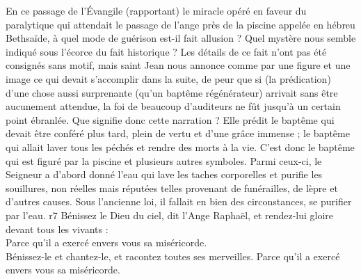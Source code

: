 \documentclass[twoside]{article}
\begin{document}
\begin{paracol}[1]{2}
{		En ce passage de l’Évangile (rapportant) le miracle opéré en faveur du paralytique qui attendait le passage de l’ange près de la piscine appelée en hébreu Bethsaïde, à quel mode de guérison est-il fait allusion ? Quel mystère nous semble indiqué sous l’écorce du fait historique ? Les détails de ce fait n’ont pas été consignés sans motif, mais saint Jean nous annonce comme par une figure et une image ce qui devait s’accomplir dans la suite, de peur que si (la prédication) d’une chose aussi surprenante (qu’un baptême régénérateur) arrivait sans être aucunement attendue, la foi de beaucoup d’auditeurs ne fût jusqu’à un certain point ébranlée. Que signifie donc cette narration ? Elle prédit le baptême qui devait être conféré plus tard, plein de vertu et d’une grâce immense ; le baptême qui allait laver tous les péchés et rendre des morts à la vie. C’est donc le baptême qui est figuré par la piscine et plusieurs autres symboles. Parmi ceux-ci, le Seigneur a d’abord donné l’eau qui lave les taches corporelles et purifie les souillures, non réelles mais réputées telles provenant de funérailles, de lèpre et d’autres causes. Sous l’ancienne loi, il fallait en bien des circonstances, se purifier par l’eau.
	}
	{r7}
	{\rr Bénissez le Dieu du ciel, dit l’Ange Raphaël, et rendez-lui gloire devant tous les vivants :\\
	\GreSpecial{*} Parce qu’il a exercé envers vous sa miséricorde.\\
	\vv Bénissez-le et chantez-le, et racontez toutes ses merveilles.
	\GreSpecial{*} Parce qu’il a exercé envers vous sa miséricorde.}
	

\end{paracol}
\end{document}
